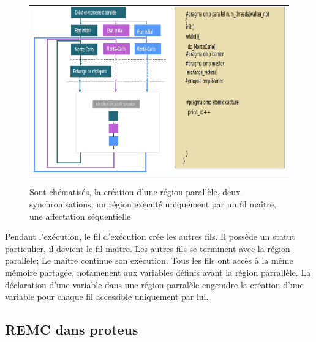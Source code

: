    \begin{figure}[!htbp]
     \centering
     \begin{tabular}{c}
       \includegraphics[width=14cm]{figure/openMP.png} 
     \end{tabular}     
     \caption{ Sont chématisés, la création d'une région parallèle, deux synchronisations, un région executé uniquement par un fil maître, une affectation séquentielle }
\label{fig:openMP}
   \end{figure}

Pendant l'exécution, le fil d'exécution crée les autres fils. Il possède un statut particulier, il devient le fil maître. Les autres fils se terminent avec la région parallèle; Le maître continue son exécution. Tous les fils ont accès à la même mémoire partagée, notamenent aux variables définis avant la région parrallèle. La déclaration d'une variable dans une région parralèle engemdre la création d'une variable pour chaque fil accessible uniquement par lui. 
   

\subsection{REMC dans proteus}

